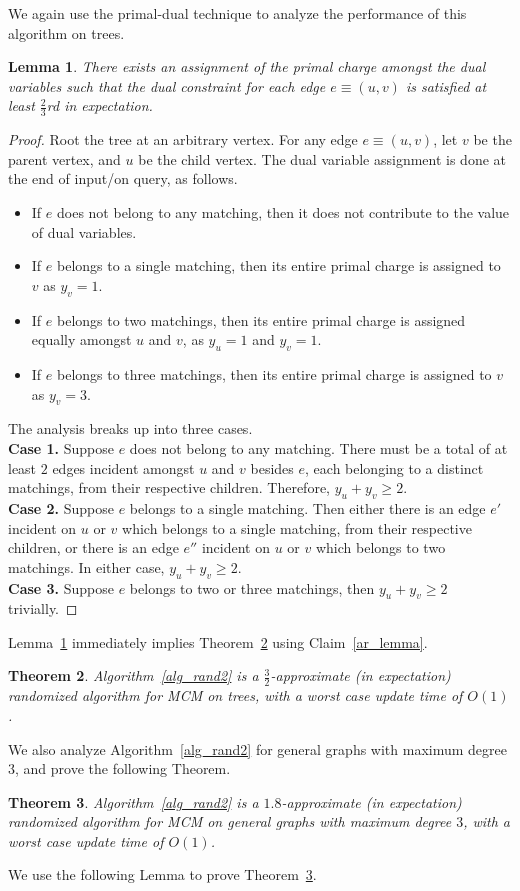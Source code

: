 \documentclass[11pt]{article}
\newtheorem{theorem}{Theorem}
\newtheorem{lemma}[theorem]{Lemma}
\begin{document}
We again use the primal-dual technique to analyze the performance of this algorithm on trees. 
\begin{lemma}\label{tree2}
There exists an assignment of the primal charge amongst the dual variables such that the dual constraint for each edge $e\equiv (u,v)$ is satisfied at least $\frac{2}{3}$rd in expectation.
 \end{lemma}
\begin{proof}
Root the tree at an arbitrary vertex. For any edge $e\equiv (u,v)$, let $v$ be the parent vertex, and $u$ be the child vertex. The dual variable assignment is done at the end of input/on query, as follows.
\begin{itemize}
 \item If $e$ does not belong to any matching, then it does not contribute to the value of dual variables.
 \item If $e$ belongs to a single matching, then its entire primal charge is assigned to $v$ as $y_v=1$.
 \item If $e$ belongs to two matchings, then its entire primal charge is assigned equally amongst $u$ and $v$, as $y_u=1$ and $y_v=1$.
 \item If $e$ belongs to three matchings, then its entire primal charge is assigned to $v$ as $y_v=3$.
 \end{itemize}
 The analysis breaks up into three cases.\\  
   \textbf{Case 1.} Suppose $e$ does not belong to any matching. There must be a total of at least $2$ edges incident amongst $u$ and $v$ besides $e$, each belonging to a distinct matchings, from their respective children. Therefore, $y_u+y_v\geq 2$.\\
     \textbf{Case 2.} Suppose $e$ belongs to a single matching. Then either there is an edge $e'$ incident on $u$ or $v$ which belongs to a single matching, from their respective children, or there is an edge $e''$ incident on $u$ or $v$ which belongs to two matchings. In either case, $y_u+y_v\geq 2$.\\
   \textbf{Case 3.} Suppose $e$ belongs to two or three matchings, then $y_u+y_v\geq 2$ trivially.
\end{proof}
Lemma~\ref{tree2} immediately implies Theorem~\ref{ub_MCM2} using Claim~\ref{ar_lemma}.
\begin{theorem}\label{ub_MCM2}
 Algorithm~\ref{alg_rand2} is a $\frac{3}{2}$-approximate (in expectation) randomized algorithm for MCM on trees, with a worst case update time of $O(1)$.
\end{theorem}
We also analyze Algorithm~\ref{alg_rand2} for general graphs with maximum degree $3$, and prove the following Theorem.
\begin{theorem}\label{thm_gen3}
 Algorithm~\ref{alg_rand2} is a $1.8$-approximate (in expectation) randomized algorithm for MCM on general graphs with maximum degree $3$, with a worst case update time of $O(1)$.
\end{theorem}
We use the following Lemma to prove Theorem~\ref{thm_gen3}.
\end{document}
